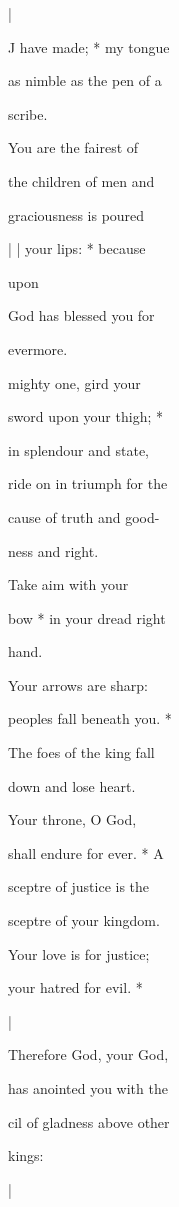 \documentclass{breviary}
\begin{document}
\begin{brevbody}
\blackrule
\begin{rubricpar}
|

\end{rubricpar}
J have made; * my tongue

as nimble as the pen of a

scribe.

You are the fairest of

the children of men and

graciousness is poured

| | your lips: * because

upon

God has blessed you for

evermore.

\vers{} mighty one, gird your

sword upon your thigh; *

in splendour and state,

ride on in triumph for the

cause of truth and good-

ness and right.

Take aim with your

bow * in your dread right

hand.

Your arrows are sharp:

peoples fall beneath you. *

The foes of the king fall

down and lose heart.

Your throne, O God,

shall endure for ever. * A

sceptre of justice is the

sceptre of your kingdom.

Your love is for justice;

your hatred for evil. *

\begin{rubricpar}
|

\end{rubricpar}
Therefore God, your God,

has anointed you with the

cil of gladness above other

kings:

\begin{rubricpar}
|


\end{rubricpar}
\end{brevbody}
\end{document}
